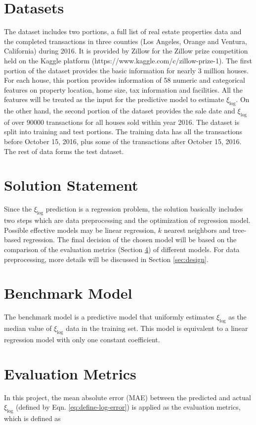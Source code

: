 \documentclass[12pt]{article}
\begin{document}
\section{Datasets}\label{sec:dataset}
The dataset includes two portions, a full list of real estate properties data and the completed transactions in three counties (Los Angeles, Orange and Ventura, California) during 2016. It is provided by Zillow for the Zillow prize competition held on the Kaggle platform (https://www.kaggle.com/c/zillow-prize-1). The first portion of the dataset provides the basic information for nearly 3 million houses. For each house, this portion provides information of 58 numeric and categorical features on property location, home size, tax information and facilities. All the features will be treated as the input for the predictive model to estimate $\xi_{\log}$. On the other hand, the second portion of the dataset provides the sale date and $\xi_{\log}$ of over 90000 transactions for all houses sold within year 2016. The dataset is split into training and test portions. The training data has all the transactions before October 15, 2016, plus some of the transactions after October 15, 2016. The rest of data forms the test dataset.

\section{Solution Statement}\label{sec:solutionstate}
Since the $\xi_{\log}$ prediction is a regression problem, the solution basically includes two steps which are data preprocessing and the optimization of regression model. Possible effective models may be linear regression, $k$ nearest neighbors and tree-based regression. The final decision of the chosen model will be based on the comparison of the evaluation metrics (Section \ref{sec:metric}) of different models. For data preprocessing, more details will be discussed in Section \ref{sec:design}.

\section{Benchmark Model}\label{sec:benchmark}
The benchmark model is a predictive model that uniformly estimates $\xi_{\log}$ as the median value of $\xi_{\log}$ data in the training set. This model is equivalent to a linear regression model with only one constant coefficient.

\section{Evaluation Metrics}\label{sec:metric}
In this project, the mean absolute error (MAE) between the predicted and actual $\xi_{\log}$ (defined by Eqn. \ref{eq:define-log-error}) is applied as the evaluation metrics, which is defined as 
\end{document}
